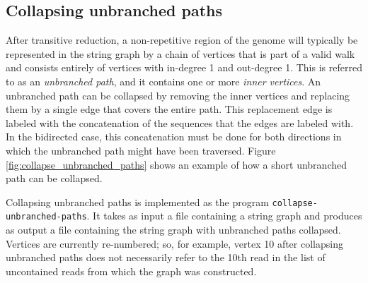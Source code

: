 \documentclass[10pt]{article}
\newcommand{\Figure}[1]{Figure \ref{#1}}
\newcommand{\KeyTerm}[1]{{\it #1}}
\newcommand{\ProgramName}[1]{{\tt #1}}
\begin{document}
\subsection{Collapsing unbranched paths}

After transitive reduction, a non-repetitive region of the genome will typically
be represented in the string graph by a chain of vertices that is part of a
valid walk and consists entirely of vertices with in-degree 1 and out-degree 1.
This is referred to as an \KeyTerm{unbranched path}, and it contains one or more
\KeyTerm{inner vertices}.  An unbranched path can be collapsed by removing the
inner vertices and replacing them by a single edge that covers the entire path.
This replacement edge is labeled with the concatenation of the sequences that
the edges are labeled with.  In the bidirected case, this concatenation must be
done for both directions in which the unbranched path might have been traversed.
\Figure{fig:collapse_unbranched_paths} shows an example of how a short
unbranched path can be collapsed.

Collapsing unbranched paths is implemented as the program
\ProgramName{collapse-unbranched-paths}.  It takes as input a file containing a
string graph and produces as output a file containing the string graph with
unbranched paths collapsed.  Vertices are currently re-numbered; so, for
example, vertex 10 after collapsing unbranched paths does not necessarily refer
to the 10th read in the list of uncontained reads from which the graph was
constructed.
\end{document}
